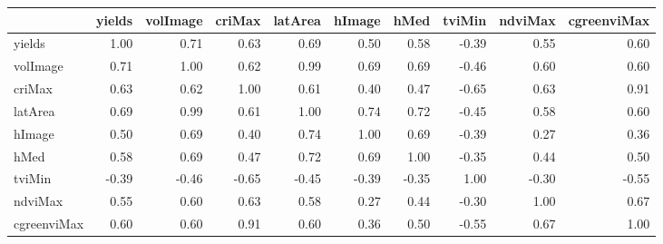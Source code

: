 \begin{tabular}{lrrrrrrrrr}
\toprule
{} &  yields &  volImage &  criMax &  latArea &  hImage &  hMed &  tviMin &  ndviMax &  cgreenviMax \\
\midrule
yields      &    1.00 &      0.71 &    0.63 &     0.69 &    0.50 &  0.58 &   -0.39 &     0.55 &         0.60 \\
volImage    &    0.71 &      1.00 &    0.62 &     0.99 &    0.69 &  0.69 &   -0.46 &     0.60 &         0.60 \\
criMax      &    0.63 &      0.62 &    1.00 &     0.61 &    0.40 &  0.47 &   -0.65 &     0.63 &         0.91 \\
latArea     &    0.69 &      0.99 &    0.61 &     1.00 &    0.74 &  0.72 &   -0.45 &     0.58 &         0.60 \\
hImage      &    0.50 &      0.69 &    0.40 &     0.74 &    1.00 &  0.69 &   -0.39 &     0.27 &         0.36 \\
hMed        &    0.58 &      0.69 &    0.47 &     0.72 &    0.69 &  1.00 &   -0.35 &     0.44 &         0.50 \\
tviMin      &   -0.39 &     -0.46 &   -0.65 &    -0.45 &   -0.39 & -0.35 &    1.00 &    -0.30 &        -0.55 \\
ndviMax     &    0.55 &      0.60 &    0.63 &     0.58 &    0.27 &  0.44 &   -0.30 &     1.00 &         0.67 \\
cgreenviMax &    0.60 &      0.60 &    0.91 &     0.60 &    0.36 &  0.50 &   -0.55 &     0.67 &         1.00 \\
\bottomrule
\end{tabular}
